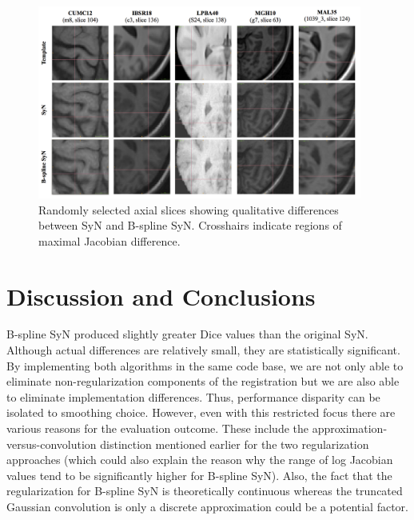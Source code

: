 \documentclass{frontiersSCNS}
\begin{document}
\begin{figure}[htb]
  \centering
    \includegraphics[width=0.95\textwidth]{qualitative.jpg}
  \caption{Randomly selected axial slices showing qualitative differences between
  SyN and B-spline SyN.  Crosshairs indicate regions of maximal Jacobian difference. 
  }
  \label{fig:qualitative}
\end{figure}

\section{Discussion and Conclusions}

B-spline SyN produced slightly greater Dice values than the original SyN. 
Although actual differences are relatively small, they are statistically 
significant. By implementing both algorithms in the same code base, 
we are not only able to eliminate non-regularization components of the 
registration but we are also able to eliminate implementation differences. 
Thus, performance disparity can be isolated to smoothing choice. However, 
even with this restricted focus there are various reasons for the evaluation 
outcome. These include the approximation-versus-convolution distinction 
mentioned earlier for the two regularization approaches (which could also 
explain the reason why the range of log Jacobian values tend to be significantly 
higher for B-spline SyN). Also, the fact that the regularization for 
B-spline SyN is theoretically continuous whereas the truncated Gaussian 
convolution is only a discrete approximation could be a potential factor. 
\end{document}
